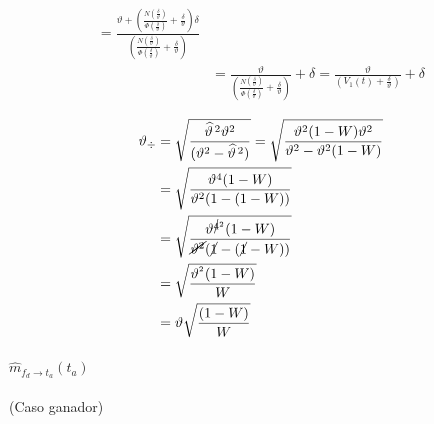 \documentclass[11pt,twoside, spanish]{report} %
\begin{document}
\begin{equation}
\begin{split}
		=   \frac{\vartheta +\left(\frac{N(\frac{\delta}{\vartheta})}{\Phi(\frac{\delta}{\vartheta})}+ \frac{\delta}{\vartheta}\right)\delta}  {\left(\frac{N(\frac{\delta}{\vartheta})}{\Phi(\frac{\delta}{\vartheta})}+ \frac{\delta}{\vartheta}\right) }\\
		&=   \frac{\vartheta}  {\left(\frac{N(\frac{\delta}{\vartheta})}{\Phi(\frac{\delta}{\vartheta})}+ \frac{\delta}{\vartheta}\right) } +  \delta
		=   \frac{\vartheta}  {\left(V_1(t)+ \frac{\delta}{\vartheta}\right) } +  \delta
	\end{split}
\end{equation}

\begin{equation}
	\begin{split}
		\vartheta_{\div} &= \sqrt{\frac{\widehat{\vartheta}^{\,2}\vartheta^2}{(\vartheta^2 - \widehat{\vartheta}^{\,2})}}
		= \sqrt{\frac{\vartheta^2(1-W)\vartheta^2}{\vartheta^2-\vartheta^2(1-W)}}\\
		&= \sqrt{\frac{\vartheta^4(1-W)}{\vartheta^2(1-(1-W))}}\\
		&= \sqrt{\frac{\vartheta^{\cancel{4}^2}(1-W)}{\cancel{\vartheta^2}(\cancel{1}-(\cancel{1}-W))}}\\
		&= \sqrt{\frac{\vartheta^{^2}(1-W)}{W}}\\
		&=\vartheta \sqrt{\frac{(1-W)}{W}}
	\end{split}
\end{equation}






\paragraph{$\widehat{m}_{f_d \rightarrow t_a}(t_a)$} (Caso ganador)
\end{document}
